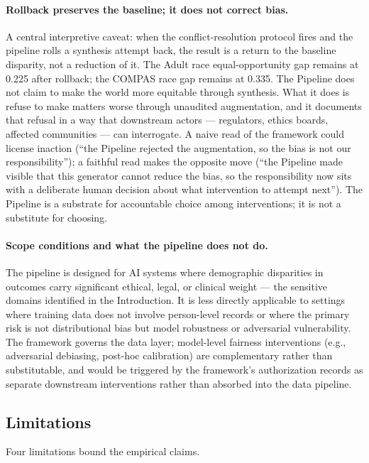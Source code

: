 \documentclass[11pt]{article}
\begin{document}
\paragraph{Rollback preserves the baseline; it does not correct bias.} A central interpretive caveat: when the conflict-resolution protocol fires and the pipeline rolls a synthesis attempt back, the result is a return to the baseline disparity, not a reduction of it. The Adult race equal-opportunity gap remains at 0.225 after rollback; the COMPAS race gap remains at 0.335. The Pipeline does not claim to make the world more equitable through synthesis. What it does is refuse to make matters worse through unaudited augmentation, and it documents that refusal in a way that downstream actors --- regulators, ethics boards, affected communities --- can interrogate. A naive read of the framework could license inaction (``the Pipeline rejected the augmentation, so the bias is not our responsibility''); a faithful read makes the opposite move (``the Pipeline made visible that this generator cannot reduce the bias, so the responsibility now sits with a deliberate human decision about what intervention to attempt next''). The Pipeline is a substrate for accountable choice among interventions; it is not a substitute for choosing.

\paragraph{Scope conditions and what the pipeline does not do.} The pipeline is designed for AI systems where demographic disparities in outcomes carry significant ethical, legal, or clinical weight --- the sensitive domains identified in the Introduction. It is less directly applicable to settings where training data does not involve person-level records or where the primary risk is not distributional bias but model robustness or adversarial vulnerability. The framework governs the data layer; model-level fairness interventions (e.g., adversarial debiasing, post-hoc calibration) are complementary rather than substitutable, and would be triggered by the framework's authorization records as separate downstream interventions rather than absorbed into the data pipeline.

\subsection{Limitations}
\label{sec:limitations}

Four limitations bound the empirical claims.
\end{document}
